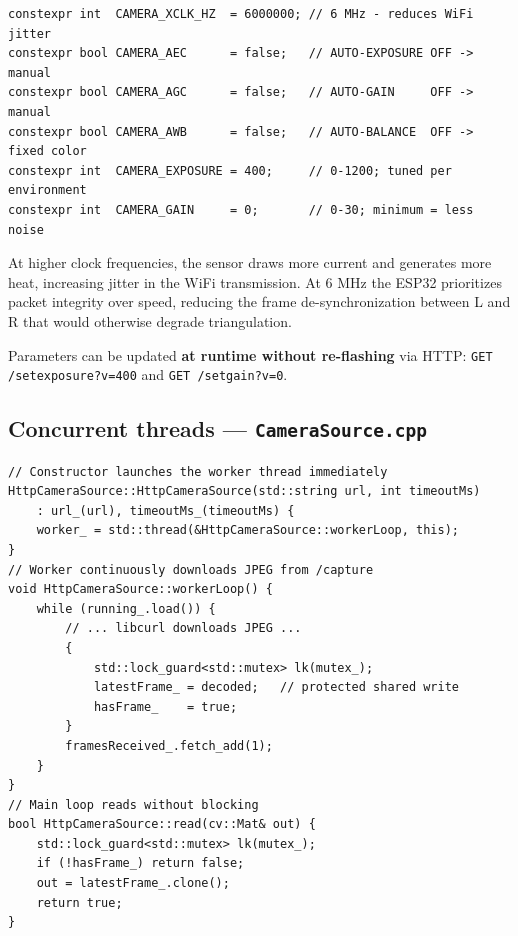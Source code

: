 \documentclass[11pt,a4paper]{article}
\begin{document}
\begin{lstlisting}[caption={Fixed firmware parameters (lines 52--58)}]
constexpr int  CAMERA_XCLK_HZ  = 6000000; // 6 MHz - reduces WiFi jitter
constexpr bool CAMERA_AEC      = false;   // AUTO-EXPOSURE OFF -> manual
constexpr bool CAMERA_AGC      = false;   // AUTO-GAIN     OFF -> manual
constexpr bool CAMERA_AWB      = false;   // AUTO-BALANCE  OFF -> fixed color
constexpr int  CAMERA_EXPOSURE = 400;     // 0-1200; tuned per environment
constexpr int  CAMERA_GAIN     = 0;       // 0-30; minimum = less noise
\end{lstlisting}

\begin{critbox}[frametitle={Why XCLK = 6 MHz instead of the default 20 MHz}]
At higher clock frequencies, the sensor draws more current and generates more heat,
increasing jitter in the WiFi transmission. At 6 MHz the ESP32 prioritizes packet
integrity over speed, reducing the frame de-synchronization between L and R that
would otherwise degrade triangulation.
\end{critbox}

Parameters can be updated \textbf{at runtime without re-flashing} via HTTP:
\texttt{GET /setexposure?v=400} and \texttt{GET /setgain?v=0}.

\subsection*{Concurrent threads --- \texttt{CameraSource.cpp}}

\begin{lstlisting}[caption={Producer thread for HTTP camera frames}]
// Constructor launches the worker thread immediately
HttpCameraSource::HttpCameraSource(std::string url, int timeoutMs)
    : url_(url), timeoutMs_(timeoutMs) {
    worker_ = std::thread(&HttpCameraSource::workerLoop, this);
}
// Worker continuously downloads JPEG from /capture
void HttpCameraSource::workerLoop() {
    while (running_.load()) {
        // ... libcurl downloads JPEG ...
        {
            std::lock_guard<std::mutex> lk(mutex_);
            latestFrame_ = decoded;   // protected shared write
            hasFrame_    = true;
        }
        framesReceived_.fetch_add(1);
    }
}
// Main loop reads without blocking
bool HttpCameraSource::read(cv::Mat& out) {
    std::lock_guard<std::mutex> lk(mutex_);
    if (!hasFrame_) return false;
    out = latestFrame_.clone();
    return true;
}
\end{lstlisting}
\end{document}
